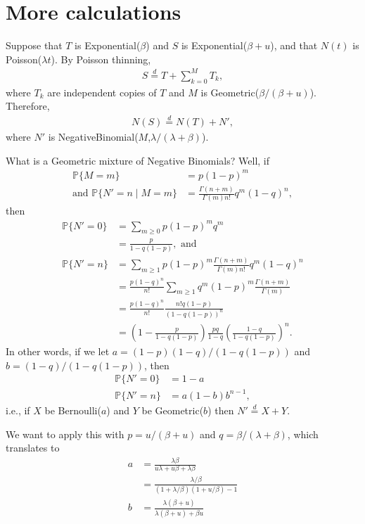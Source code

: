 \documentclass{article}
\renewcommand{\P}{\mathbb{P}}
\newcommand{\given}{\mid}
\newcommand{\deq}{\stackrel{\scriptscriptstyle{d}}{=}}
\begin{document}
\section{More calculations}

Suppose that $T$ is Exponential($\beta$)
and $S$ is Exponential($\beta+u$),
and that $N(t)$ is Poisson($\lambda t$).
By Poisson thinning,
\begin{align}
    S \deq T + \sum_{k=0}^M T_k,
\end{align}
where $T_k$ are independent copies of $T$
and $M$ is Geometric($\beta/(\beta+u)$).
Therefore, 
\begin{align}
    N(S) \deq N(T) + N',
\end{align}
where $N'$ is NegativeBinomial($M$,$\lambda/(\lambda+\beta)$).

What is a Geometric mixture of Negative Binomials?
Well, if 
\begin{align}
    \P\{ M = m \} &= p (1-p)^m \\
    \text{and } \P\{ N' = n \given M=m \} &= \frac{ \Gamma(n+m) }{ \Gamma(m) n! } q^m (1-q)^n, 
\end{align}
then
\begin{align}
    \P\{ N' = 0 \}
        &= \sum_{m \ge 0} p (1-p)^m q^m \\
        &= \frac{p}{1-q(1-p)} , \text{ and } \\
    \P\{ N' = n \} 
        &= \sum_{m \ge 1} p (1-p)^m \frac{ \Gamma(n+m) }{ \Gamma(m) n!} q^m (1-q)^n \\
        &= \frac{p(1-q)^n}{n!} \sum_{m \ge 1} q^m(1-p)^m \frac{ \Gamma(n+m) }{ \Gamma(m) } \\
        &= \frac{p(1-q)^n}{n!} \frac{ n! q (1-p) }{ (1-q(1-p))^n } \\
    &= (1-\frac{p}{1-q(1-p)}) \frac{ pq }{ 1-q } \left( \frac{1-q}{1-q(1-p)} \right)^n .
\end{align}
In other words,
if we let $a = (1-p)(1-q)/(1-q(1-p))$ and $b=(1-q)/(1-q(1-p))$,
then
\begin{align}
    \P\{ N' = 0 \} &= 1-a \\
    \P\{ N' = n \} &= a (1-b) b^{n-1} ,
\end{align}
i.e., if $X$ be Bernoulli($a$) and $Y$ be Geometric($b$) then $N'\deq X+Y$.

We want to apply this with $p=u/(\beta+u)$ and $q=\beta/(\lambda+\beta)$,
which translates to
\begin{align}
    a &= \frac{ \lambda \beta }{ u \lambda + u \beta + \lambda \beta } \\
      &= \frac{ \lambda/\beta }{ (1+\lambda/\beta)(1+u/\beta) - 1 } \\
    b &= \frac{ \lambda ( \beta + u ) }{ \lambda ( \beta + u ) + \beta u } 
\end{align}
\end{document}
